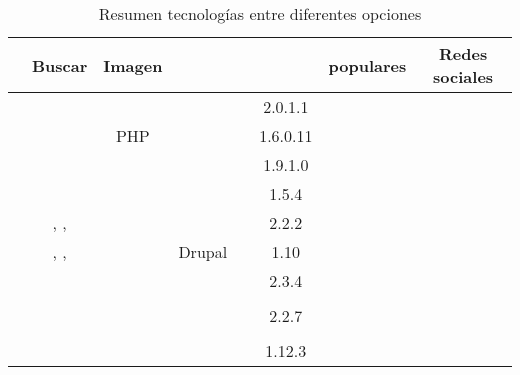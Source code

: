 \begin{table}[H]
    \tiny
    \centering
\begin{tabular}{ |l|c|c|c|c|c|c|c| }

\hline
	&
	Buscar&
	Imagen \itemCommerce&
	\raiting \itemCommerce&
	\review \itemCommerce&
	\wishlist&
	\itemsCommerce populares&
	Redes sociales

\\ \hline
	\nameOpenCart &
	\mysql&
	\php&
	&
	\gplthreelicense &
	2.0.1.1&
	&
	
\\ \hline
	\namePrestaShop &
	\mysql&
	PHP&
	&
	\opslicense &
	1.6.0.11&
	&
	
\\ \hline
	\nameMagento &
	\mysql&
	\php&
	\nameZendFramework \cite{online_zend_framework}&
	\opslicense &
	1.9.1.0&
	&
	
\\ \hline
	\nameZenCart &
	\mysql&
	\php&
	&
	\gpllicense &
	1.5.4&
	&
 
\\ \hline
	\nameSpreeCommerce &
	\mysql, \postgresql, \sqlitethree&
	\ruby \cite{online_ruby_language}&
	\rubyonrails \cite{online_ruby_rails}&
	\bsdthreelicense&
	2.2.2&
	&

\\ \hline
	\nameDrupalCommerce &
	\mysql, \postgresql, \sqlitethree&
	\php&
	Drupal\cite{online_drupal}&
	\gpllicense &
	1.10&
	&
	
\\ \hline
	\nameOsCommerce &
	\mysql&
	\php&
	&
	\gpllicense &
	2.3.4&
	&

\\ \hline
	\nameSimpleCart &
	&
	&
	&
	&
	&
	&
	
\\ \hline
	\nameWooCommerce &
	\mysql&
	\php&
	\wordPress \cite{online_wordpress}&
	\gpllicense &
	2.2.7&
	&
	
\\ \hline
	\nameWPECommerce &
	&
	&
	&
	&
	&
	&
	
\\ \hline
	\nameJigoshop &
	\mysql&
	\php&
	\wordPress \cite{online_wordpress}&
	\gpllicense &
	1.12.3&
	&
	
\\ \hline
\end{tabular}
    \caption{ Resumen tecnologías entre diferentes opciones \ecommerce}
    \label{tab:general_features_ecommerce}
\end{table}


